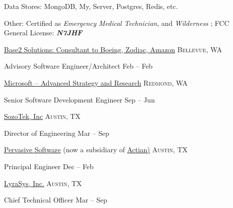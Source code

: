 \documentclass[10pt,letterpaper]{article}
\begin{document}
\vspace{0.5em}\inlineheadsection
{Data Stores:}
{MongoDB,  My,   Server, Postgres, Redis, etc.}

\vspace{0.5em}\inlineheadsection
{Other:}
{Certified as \emph{Emergency Medical Technician}, and \emph{Wilderness }; {FCC General License: \emph{\textbf{N7JHF}}}}

\vspace{1em}\spacedhrule{0.5em}{-0.4em}


	\headedsection
	{\href{https://www.microsoft.com/en-us/}{Base2 Solutions: Consultant to Boeing, Zodiac, Amazon}}
	{\textsc{Bellevue, WA}} {%
		
		\headedsubsection
		{Advisory Software Engineer/Architect}
		{Feb  -- Feb }
		{}	
	}
	
	\vspace*{1em}

	\headedsection
	{\href{https://www.microsoft.com/en-us/}{Microsoft -- Advanced Strategy and Research}}
	{\textsc{Redmond, WA}} {%
	
		\headedsubsection
		{Senior Software Development Engineer}
		{Sep  -- Jun }
		{}	
	}
		
	\vspace*{1em}
	
	\headedsection
	{\href{http://www.zoominfo.com/c/SozoTek-Inc/53446018}{SozoTek, Inc}}
	{\textsc{Austin, TX}} {%
		
		\headedsubsection
		{Director of Engineering}
		{Mar  -- Sep }
			
	}

	\vspace*{1em}
	\headedsection
	{\href{http://www.pervasive.com/}{Pervasive Software} (now a subsidiary of \href{https://www.actian.com/}{Actian)}}
	{\textsc{Austin, TX}} {%
				
		\headedsubsection
		{Principal Engineer}
		{Dec  -- Feb }

	}
					
	\vspace*{1em}
	\headedsection
	{\href{http://lyrasys.com}{LyraSys, Inc.}}
	{\textsc{Austin, TX}} {%
						
		\headedsubsection
		{Chief Technical Officer}
		{Mar  -- Sep }

	}
						
\end{document}
